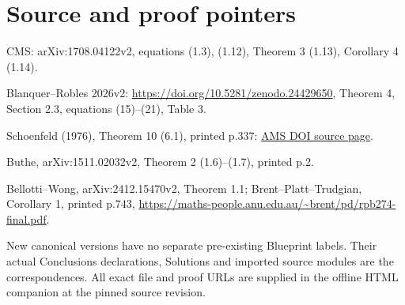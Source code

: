 \documentclass[11pt]{article}
\begin{document}
\begin{center}


\ifdim\wd\eqbox>\linewidth\resizebox{\linewidth}{!}{\usebox{\eqbox}}\else\usebox{\eqbox}\fi

\end{center}

\begin{center}


\ifdim\wd\eqbox>\linewidth\resizebox{\linewidth}{!}{\usebox{\eqbox}}\else\usebox{\eqbox}\fi

\end{center}

\begin{center}


\ifdim\wd\eqbox>\linewidth\resizebox{\linewidth}{!}{\usebox{\eqbox}}\else\usebox{\eqbox}\fi

\end{center}

\begin{center}


\ifdim\wd\eqbox>\linewidth\resizebox{\linewidth}{!}{\usebox{\eqbox}}\else\usebox{\eqbox}\fi

\end{center}

\section{Source and proof pointers}

CMS: arXiv:1708.04122v2, equations (1.3), (1.12), Theorem 3 (1.13), Corollary 4 (1.14).

Blanquer--Robles 2026v2: \url{https://doi.org/10.5281/zenodo.24429650}, Theorem 4, Section 2.3, equations (15)--(21), Table 3.

Schoenfeld (1976), Theorem 10 (6.1), printed p.337: \href{https://doi.org/10.1090/S0025-5718-1976-0457374-X}{AMS DOI source page}.

Buthe, arXiv:1511.02032v2, Theorem 2 (1.6)--(1.7), printed p.2.

Bellotti--Wong, arXiv:2412.15470v2, Theorem 1.1; Brent--Platt--Trudgian, Corollary 1, printed p.743, \url{https://maths-people.anu.edu.au/~brent/pd/rpb274-final.pdf}.

New canonical versions have no separate pre-existing Blueprint labels. Their actual Conclusions declarations, Solutions and imported source modules are the correspondences. All exact file and proof URLs are supplied in the offline HTML companion at the pinned source revision.
\end{document}
